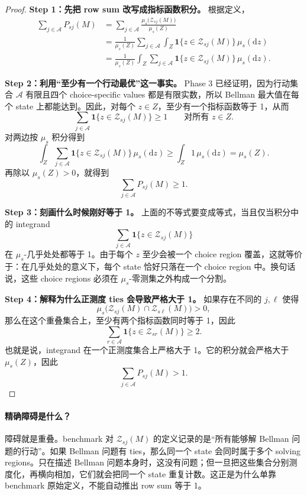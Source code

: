 \begin{proof}
\medskip\noindent\textbf{Step 1：先把 row sum 改写成指标函数积分。}
根据定义，
\begin{align*}
\sum_{j\in\mathcal A}P_{sj}(M)
&=
\sum_{j\in\mathcal A}\frac{\mu_s\bigl(\mathcal Z_{sj}(M)\bigr)}{\mu_s(Z)}\\
&=
\frac{1}{\mu_s(Z)}
\sum_{j\in\mathcal A}\int_Z \mathbf 1\{z\in \mathcal Z_{sj}(M)\}\,\mu_s(\mathrm{d} z)\\
&=
\frac{1}{\mu_s(Z)}
\int_Z \sum_{j\in\mathcal A}\mathbf 1\{z\in \mathcal Z_{sj}(M)\}\,\mu_s(\mathrm{d} z).
\end{align*}

\medskip\noindent\textbf{Step 2：利用“至少有一个行动最优”这一事实。}
Phase 3 已经证明，因为行动集合 $\mathcal A$ 有限且四个 choice-specific values 都是有限实数，所以 Bellman 最大值在每个 state 上都能达到。因此，对每个 $z\in Z$，至少有一个指标函数等于 1，从而
\[
\sum_{j\in\mathcal A}\mathbf 1\{z\in \mathcal Z_{sj}(M)\}\ge 1
\qquad\text{对所有 }z\in Z.
\]
对两边按 $\mu_s$ 积分得到
\[
\int_Z \sum_{j\in\mathcal A}\mathbf 1\{z\in \mathcal Z_{sj}(M)\}\,\mu_s(\mathrm{d} z)
\ge
\int_Z 1\,\mu_s(\mathrm{d} z)
=
\mu_s(Z).
\]
再除以 $\mu_s(Z)>0$，就得到
\[
\sum_{j\in\mathcal A}P_{sj}(M)\ge 1.
\]

\medskip\noindent\textbf{Step 3：刻画什么时候刚好等于 1。}
上面的不等式要变成等式，当且仅当积分中的 integrand
\[
\sum_{j\in\mathcal A}\mathbf 1\{z\in \mathcal Z_{sj}(M)\}
\]
在 $\mu_s$-几乎处处都等于 1。由于每个 $z$ 至少会被一个 choice region 覆盖，这就等价于：在几乎处处的意义下，每个 state 恰好只落在一个 choice region 中。换句话说，这些 choice regions 必须在 $\mu_s$-零测集之外构成一个分割。

\medskip\noindent\textbf{Step 4：解释为什么正测度 ties 会导致严格大于 1。}
如果存在不同的 $j,\ell$ 使得
\[
\mu_s\bigl(\mathcal Z_{sj}(M)\cap \mathcal Z_{s\ell}(M)\bigr)>0,
\]
那么在这个重叠集合上，至少有两个指标函数同时等于 1，因此
\[
\sum_{r\in\mathcal A}\mathbf 1\{z\in\mathcal Z_{sr}(M)\}\ge 2.
\]
也就是说，integrand 在一个正测度集合上严格大于 1。它的积分就会严格大于 $\mu_s(Z)$，因此
\[
\sum_{j\in\mathcal A}P_{sj}(M)>1.
\]
\end{proof}

\paragraph{精确障碍是什么？}
障碍就是重叠。benchmark 对 $\mathcal Z_{sj}(M)$ 的定义记录的是“所有能够解 Bellman 问题的行动”。如果 Bellman 问题有 ties，那么同一个 state 会同时属于多个 solving regions。只在描述 Bellman 问题本身时，这没有问题；但一旦把这些集合分别测度化，再横向相加，它们就会把同一个 state 重复计数。这正是为什么单靠 benchmark 原始定义，不能自动推出 row sum 等于 1。

